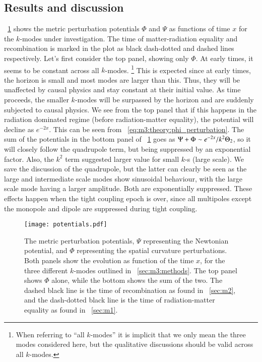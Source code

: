 \subsection{Results and discussion}\label{sec:m3:results}
    
    ~\cref{fig:m3:potentials} shows the metric perturbation potentials $\Phi$ and $\Psi$ as functions of time $x$ for the $k$-modes under investigation. The time of matter-radiation equality and recombination is marked in the plot as black dash-dotted and dashed lines respectively. Let's first consider the top panel, showing only $\Phi$. At early times, it seems to be constant across all $k$-modes. \footnote{When referring to ``all $k$-modes'' it is implicit that we only mean the three modes considered here, but the qualitative discussions should be valid across all $k$-modes.} This is expected since at early times, the horizon is small and most modes are larger than this. Thus, they will be unaffected by causal physics and stay constant at their initial value. As time proceeds, the smaller $k$-modes will be surpassed by the horizon and are suddenly subjected to causal physics. We see from the top panel that if this happens in the radiation dominated regime (before radiation-matter equality), the potential will decline as $e^{-2x}$. This can be seen from ~\cref{eq:m3:theory:phi_perturbation}. The sum of the potentials in the bottom panel of ~\cref{fig:m3:potentials} goes as $\Psi+\Phi \sim e^{-2x}/k^2\Theta_2$, so it will closely follow the quadrupole term, but being suppressed by an exponential factor. Also, the $k^2$ term suggested larger value for small $k$-s (large scale). We save the discussion of the quadrupole, but the latter can clearly be seen as the large and intermediate scale modes show sinusoidal behaviour, with the large scale mode having a larger amplitude. Both are exponentially suppressed. These effects happen when the tight coupling epoch is over, since all multipoles except the monopole and dipole are suppressed during tight coupling. 
    \begin{figure}
        \texttt{[image: potentials.pdf]}
        \caption{The metric perturbation potentials, $\Psi$ representing the Newtonian potential, and $\Phi$ representing the spatial curvature perturbations. Both panels show the evolution as function of the time $x$, for the three different $k$-modes outlined in ~\cref{sec:m3:methods}. The top panel shows $\Phi$ alone, while the bottom shows the sum of the two. The dashed black line is the time of recombination as found in ~\cref{sec:m2}, and the dash-dotted black line is the time of radiation-matter equality as found in ~\cref{sec:m1}.}
        \label{fig:m3:potentials}
    \end{figure}

